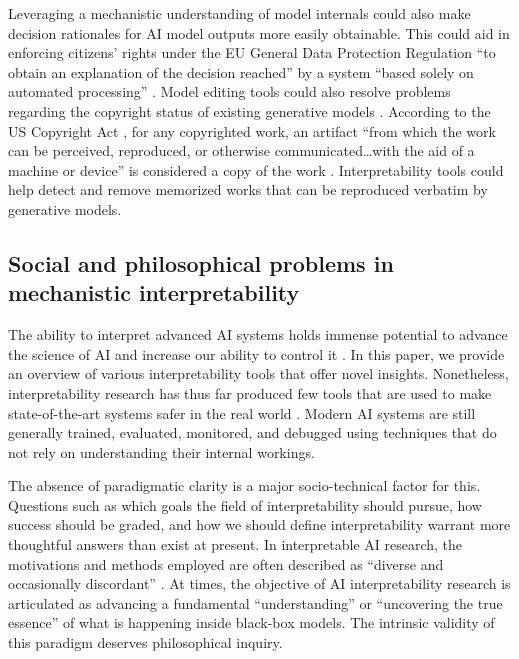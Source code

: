 Leveraging a mechanistic understanding of model internals could also make decision rationales for AI model outputs more easily obtainable. This could aid in enforcing citizens' rights under the EU General Data Protection Regulation “to obtain an explanation of the decision reached” by a system “based solely on automated processing” \citep{GDPR_2016, gilpin2019explainingexplanationssociety}. Model editing tools could also resolve problems regarding the copyright status of existing generative models \citep{grynbaum2023times}. According to the US Copyright Act \citep{USCopyright2022}, for any copyrighted work, an artifact “from which the work can be perceived, reproduced, or otherwise communicated…with the aid of a machine or device” is considered a copy of the work \citep{lee2024talkinboutaigeneration}. Interpretability tools could help detect and remove memorized works that can be reproduced verbatim by generative models.


\subsection{Social and philosophical problems in mechanistic interpretability}
\label{subsec:social-philosophical}

The ability to interpret advanced AI systems holds immense potential to advance the science of AI and increase our ability to control it \citep{critch2020airesearchconsiderationshuman,tegmark2023provablysafesystemspath,dalrymple2024guaranteedsafeaiframework}. In this paper, we provide an overview of various interpretability tools that offer novel insights. Nonetheless, interpretability research has thus far produced few tools that are used to make state-of-the-art systems safer in the real world \citep{rauker2023transparentaisurveyinterpreting}. Modern AI systems are still generally trained, evaluated, monitored, and debugged using techniques that do not rely on understanding their internal workings.

The absence of paradigmatic clarity is a major socio-technical factor for this. Questions such as which goals the field of interpretability should pursue, how success should be graded, and how we should define interpretability warrant more thoughtful answers than exist at present. In interpretable AI research, the motivations and methods employed are often described as “diverse and occasionally discordant” \citep{Lipton_2016_InterpretabilityMotivations}. At times, the objective of AI interpretability research is articulated as advancing a fundamental “understanding” or “uncovering the true essence” \citep{christensen2015peering} of what is happening inside black-box models. The intrinsic validity of this paradigm deserves philosophical inquiry. 

